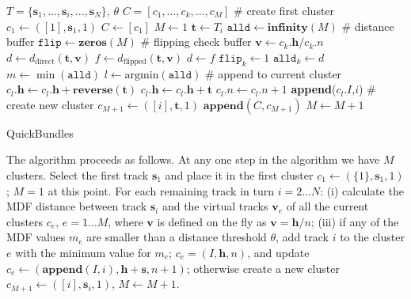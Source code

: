 \documentclass[journal]{IEEEtran}
\begin{document}
\begin{algorithm}
\begin{algorithmic}
\REQUIRE $T=\{\mathbf{s}_{1},...,\mathbf{s}_{i},...,\mathbf{s}_{N}\}$, $\theta$
\ENSURE $C=[c_{1},...,c_{k},...,c_{M}]$ 
\STATE \# create first cluster
\STATE $c_{1} \leftarrow ([1],\mathbf{s}_{1},1)$
\STATE $C\leftarrow[c_{1}]$
\STATE $M\leftarrow1$ 
	\STATE $\textbf{t}\leftarrow T_{i}$
	\STATE $\texttt{alld}\leftarrow\textbf{infinity}(M)$ \# distance buffer
	\STATE $\texttt{flip}\leftarrow\textbf{zeros}(M)$ \# flipping check buffer
		\STATE $\mathbf{v}\leftarrow c_{k}.\mathbf{h}/c_{k}.n$
		\STATE $d\leftarrow d_{\textrm{direct}}(\mathbf{t},\mathbf{v})$
		\STATE $f\leftarrow d_{\textrm{flipped}}(\mathbf{t},\mathbf{v})$
		\STATE $d \leftarrow f$
		\STATE $\texttt{flip}_{k} \leftarrow 1$
	\ENDIF
	\STATE $\texttt{alld}_{k} \leftarrow d$
	\ENDFOR
\STATE $m\leftarrow \min(\texttt{alld})$
\STATE $l\leftarrow \mathrm{arg min}(\texttt{alld})$
\STATE \# append to current cluster
		\STATE $c_{l}.\mathbf{h} \leftarrow c_{l}.\mathbf{h} + \textbf{reverse}(\textbf{t})$
	\ELSE
		\STATE $c_{l}.\mathbf{h} \leftarrow c_{l}.\mathbf{h} + \textbf{t}$
	\ENDIF
	\STATE $c_{l}.n \leftarrow c_{l}.n + 1$
	\STATE \textbf{append}($c_{l}.I$,$i$)
\ELSE 
\STATE \# create new cluster
        \STATE $c_{M+1} \leftarrow ([i],\mathbf{t},1)$
        \STATE $\mathbf{append}(C,c_{M+1})$
	\STATE $M\leftarrow M+1$
\ENDIF
\ENDFOR 
\end{algorithmic}

\caption{QuickBundles}
\label{Alg:QuickBundles}
\end{algorithm}

The algorithm proceeds as follows.  At any one step in the algorithm we
have $M$ clusters. Select the first track $\mathbf{s}_{1}$ and place it in
the first cluster $c_{1}\leftarrow(\{1\},\mathbf{s}_{1},1)$;  
$M=1$ at this point.  For each remaining track in turn $i = 2 \dots N$:
(i) calculate the MDF distance between track $\mathbf{s}_{i}$ and the virtual
tracks $\mathbf{v}_{e}$ of all the current clusters $c_{e}$, $e = 1 \dots M$,
where $\mathbf{v}$ is defined on the fly as $\mathbf{v}=\mathbf{h}/n$; (iii) if
any of the MDF values $m_{e}$ are smaller than a distance threshold
$\theta$, add track $i$ to the cluster $e$ with the minimum value for
$m_{e}$; $c_{e}=(I,\mathbf{h},n)$, and update
$c_{e}\leftarrow(\mathbf{append}(I,i),\mathbf{h}+\mathbf{s},n+1)$; otherwise create a new
cluster $c_{M+1}\leftarrow([i],\mathbf{s}_{i},1)$, $M\leftarrow M+1$.
\end{document}
